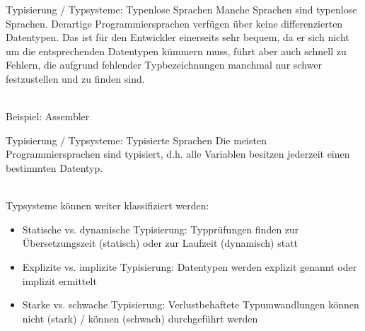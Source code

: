             \begin{frame}{Typisierung / Typsysteme: Typenlose Sprachen}
                Manche Sprachen sind typenlose Sprachen. Derartige Programmiersprachen verfügen über keine differenzierten Datentypen. Das ist für den Entwickler einerseits sehr bequem, da er sich nicht um die entsprechenden Datentypen kümmern muss, führt aber auch schnell zu Fehlern, die aufgrund fehlender Typbezeichnungen manchmal nur schwer festzustellen und zu finden sind.  \\~\
                
                Beispiel: Assembler
                
                
            \end{frame}
            
            \begin{frame}{Typisierung / Typsysteme: Typisierte Sprachen}
                Die meisten Programmiersprachen sind typisiert, d.h. alle Variablen besitzen jederzeit einen bestimmten Datentyp. \\~\
                
                Typsysteme können weiter klassifiziert werden:
                \begin{itemize}
                    \item Statische vs. dynamische Typisierung: Typprüfungen finden zur Übersetzungszeit (statisch) oder zur Laufzeit (dynamisch) statt
                    \item Explizite vs. implizite Typisierung: Datentypen werden explizit genannt oder implizit ermittelt
                    \item Starke vs. schwache Typisierung: Verlustbehaftete Typumwandlungen können nicht (stark) / können (schwach) durchgeführt werden
                \end{itemize}
                
            \end{frame}
            
